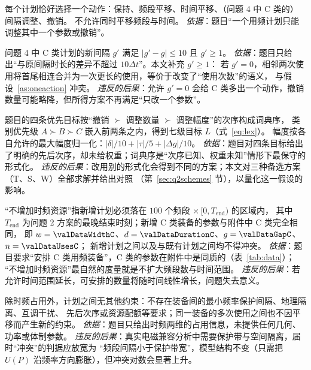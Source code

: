 \begin{assumption}[动作的互斥性（题）]\label{as:oneaction}
每个计划恰好选择一个动作：保持、频段平移、时间平移、（问题 4 中 C 类的）间隔调整、撤销。
不允许同时平移频段与时间。
\emph{依据}：题目“一个用频计划只能调整其中一个参数或撤销”。
\end{assumption}

\begin{assumption}[间隔调整的下界（本文）]\label{as:gap}
问题 4 中 C 类计划的新间隔 $g'$ 满足 $|g'-g|\le 10$ 且 $g'\ge 1$。
\emph{依据}：题目只给出“与原间隔时长的差异不超过 $10\Delta t$”。本文补充 $g'\ge 1$：
若 $g'=0$，相邻两次使用将首尾相连合并为一次更长的使用，等价于改变了“使用次数”的语义，
与假设~\ref{as:oneaction} 冲突。
\emph{违反的后果}：允许 $g'=0$ 会给 C 类多出一个动作，撤销数量可能略降，但所得方案不再满足“只改一个参数”。
\end{assumption}

\begin{assumption}[目标的词典序解释（本文）]\label{as:lex}
题目的四条优先目标按“撤销 $\succ$ 调整数量 $\succ$ 调整幅度”的次序构成词典序，
类别优先级 $A\succ B\succ C$ 嵌入前两条之内，得到七级目标 $L$（式~\eqref{eq:lex}）。
幅度按各自允许的最大幅度归一化：$|\delta|/10+|\tau|/5+|\Delta g|/10$。
\emph{依据}：题目对四条目标给出了明确的先后次序，却未给权重；词典序是“次序已知、权重未知”情形下最保守的形式化\cite{ehrgott2005}。
\emph{违反的后果}：改用别的形式化会得到不同的方案；本文对三种备选方案（T、S、W）全部求解并给出对照
（第~\ref{sec:q2schemes} 节），以量化这一假设的影响。
\end{assumption}

\begin{assumption}[问题 3 的资源区域与新增计划参数（本文）]\label{as:pack}
“不增加时频资源”指新增计划必须落在 $100$ 个频段 $\times\,[0,T_{\mathrm{end}})$ 的区域内，
其中 $T_{\mathrm{end}}$ 为问题 2 方案的最晚结束时刻；新增 C 类装备的参数与附件中 C 类完全相同，
即 $w=\valDataWidthC$、$d=\valDataDurationC$、$g=\valDataGapC$、$n=\valDataUsesC$；
新增计划之间以及与既有计划之间均不得冲突。
\emph{依据}：题目要求“安排 C 类用频装备”，C 类的参数在附件中是同质的（表~\ref{tab:data}）；
“不增加时频资源”最自然的度量就是不扩大频段数与时间范围。
\emph{违反的后果}：若允许时间范围延长，可安排的数量将随时间线性增长，问题失去意义。
\end{assumption}

\begin{assumption}[计划之间无其他耦合（本文）]\label{as:indep}
除时频占用外，计划之间无其他约束：不存在装备间的最小频率保护间隔、地理隔离、互调干扰、
先后次序或资源配额等要求；同一装备的多次使用之间也不因平移而产生新的约束。
\emph{依据}：题目只给出时频两维的占用信息，未提供任何几何、功率或体制参数。
\emph{违反的后果}：真实电磁兼容分析中需要保护带与空间隔离，届时“冲突”的判据应放宽为
“频段间隔小于保护带宽”，模型结构不变（只需把 $U(P)$ 沿频率方向膨胀），但冲突对数会显著上升。
\end{assumption}

